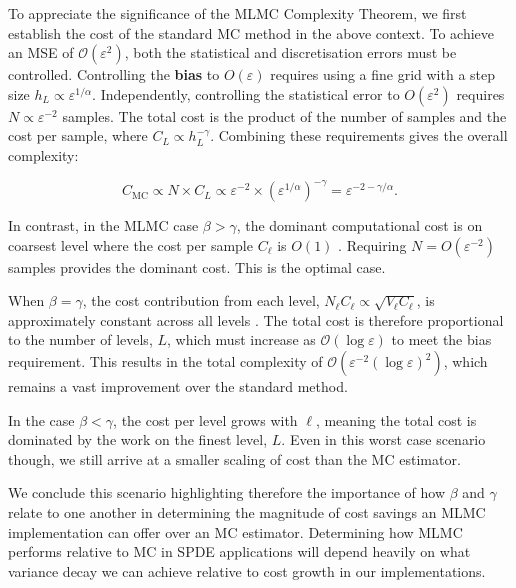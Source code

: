 To appreciate the significance of the MLMC Complexity Theorem, we first establish the cost of the 
standard MC method in the above context. To achieve an MSE of 
$\mathcal{O}(\varepsilon^2)$, both the statistical and discretisation errors must be controlled.
Controlling the \textbf{bias} to $O(\varepsilon)$ requires using a fine grid with a 
step size $h_L \propto \varepsilon^{1/\alpha}$. Independently, controlling the 
statistical error to $O(\varepsilon^2)$ requires 
$N \propto \varepsilon^{-2}$ samples. The total cost is the product of the number of 
samples and the cost per sample, where $C_L \propto h_L^{-\gamma}$. Combining these 
requirements gives the overall complexity:

$$
C_{\mathrm{MC}} \propto N \times C_L \propto \varepsilon^{-2} 
\times (\varepsilon^{1/\alpha})^{-\gamma} = \varepsilon^{-2-\gamma/\alpha}.
$$

In contrast, in the MLMC case $\beta > \gamma$, the dominant computational
cost is on coarsest level where the cost per sample $C_\ell$ is $O(1)$ 
\cite{giles2015multilevel}.
Requiring $N = O(\varepsilon^{-2})$ samples provides the dominant cost. This is the optimal 
case.

When $\beta = \gamma$, the cost contribution from each level, 
$N_\ell C_\ell \propto \sqrt{V_\ell C_\ell}$, is approximately constant across 
all levels \cite{giles2015multilevel}. The total cost is therefore proportional to the 
number of levels, $L$, which must increase as $\mathcal{O}(\log \varepsilon)$ to 
meet the bias requirement. This results in the total complexity of 
$\mathcal{O}(\varepsilon^{-2}(\log \varepsilon)^2)$, which remains a vast 
improvement over the standard method.

In the case $\beta < \gamma$, the cost per level grows with $\ell$, meaning 
the total cost is dominated by the work on the finest level, $L$. 
Even in this worst case scenario though, we still arrive at a smaller scaling of cost 
than the MC estimator. 

We conclude this scenario highlighting therefore the importance of how
$\beta$ and $\gamma$ relate to one another in determining the 
magnitude of cost savings an MLMC implementation can offer over an MC estimator. Determining
how MLMC performs relative to MC in SPDE applications will depend heavily on 
what variance decay we can achieve relative to cost growth in our implementations.

